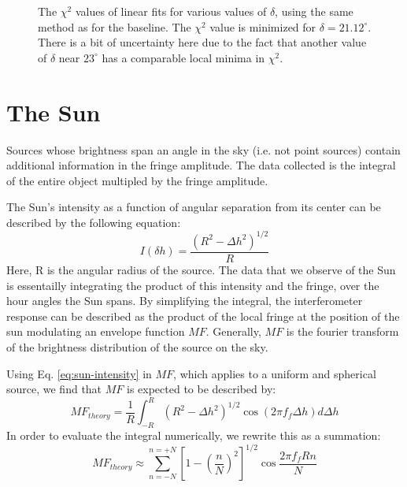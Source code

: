 \documentclass[12pt]{article}
\begin{document}
\begin{figure}[H]
\caption[SODUMB]{The $\chi^2$ values of linear fits for various values of $\delta$, using the same method as for the baseline. The $\chi^2$ value is minimized for $\delta = 21.12^\circ$. There is a bit of uncertainty here due to the fact that another value of $\delta$ near $23^\circ$ has a comparable local minima in $\chi^2$.}
\label{fig:dec-chi2}
\end{figure}

\section{The Sun}
Sources whose brightness span an angle in the sky (i.e. not point sources) contain additional information in the fringe amplitude. The data collected is the integral of the entire object multipled by the fringe amplitude.

The Sun's intensity as a function of angular separation from its center can be described by the following equation:
\begin{equation}
I(\delta h ) = \frac{(R^2 - \Delta{h}^2)^{1/2}}{R} \label{eq:sun-intensity}
\end{equation}
Here, R is the angular radius of the source. The data that we observe of the Sun is essentailly integrating the product of this intensity and the fringe, over the hour angles the Sun spans. By simplifying the integral, the interferometer response can be described as the product of the local fringe at the position of the sun modulating an envelope function $MF$. Generally, $MF$ is the fourier transform of the brightness distribution of the source on the sky.

Using Eq. \ref{eq:sun-intensity} in $MF$, which applies to a uniform and spherical source, we find that $MF$ is expected to be described by:
\begin{equation}
MF_{theory} = \frac{1}{R} \int_{-R}^{R} (R^2 - \Delta{h}^2)^{1/2} \cos{(2\pi f_f \Delta{h})} d\Delta{h}
\end{equation}
In order to evaluate the integral numerically, we rewrite this as a summation:
\begin{equation}
MF_{theory} \approx \sum_{n=-N}^{n=+N} \left[ 1- \left( \frac{n}{N} \right) ^2 \right]^{1/2} \cos{\frac{2\pi f_f R n}{N}}
\end{equation}
\end{document}

